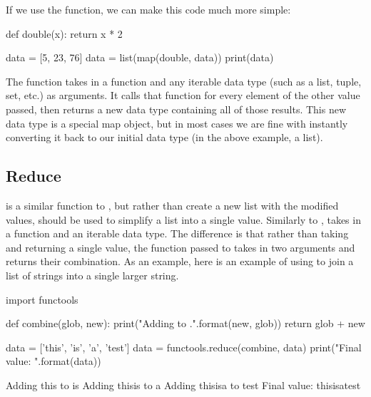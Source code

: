 \documentclass[11pt]{cselabheader}
\begin{document}
If we use the  function, we can make this code much more simple:

\begin{python3code}
def double(x):
    return x * 2

data = [5, 23, 76]
data = list(map(double, data))
print(data)
\end{python3code}

\begin{verbatimcode}
[10, 46, 152]
\end{verbatimcode}

The  function takes in a function and any iterable data type
(such as a list, tuple, set, etc.) as arguments. It calls that function for
every element of the other value passed, then returns a new data type containing
all of those results. This new data type is a special map object, but in most
cases we are fine with instantly converting it back to our initial data type (in
the above example, a list).


\subsection{Reduce}
\label{subsec:reduce}
 is a similar function to , but rather than
create a new list with the modified values,  should be used to
simplify a list into a single value. Similarly to ,
 takes in a function and an iterable data type. The difference
is that rather than taking and returning a single value, the function passed to
 takes in two arguments and returns their combination. As an
example, here is an example of using  to join a list of
strings into a single larger string.

\begin{python3code}
import functools

def combine(glob, new):
    print("Adding {} to {}.".format(new, glob))
    return glob + new

data = ['this', 'is', 'a', 'test']
data = functools.reduce(combine, data)
print("Final value: {}".format(data))
\end{python3code}

\begin{python3code}
Adding this to is
Adding thisis to a
Adding thisisa to test
Final value: thisisatest
\end{python3code}
\end{document}
